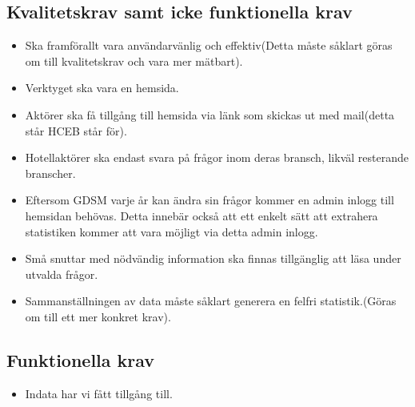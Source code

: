 \documentclass{article}
\begin{document}
    \subsection{Kvalitetskrav samt icke funktionella krav}
        \begin{itemize}
            \item Ska framförallt vara användarvänlig och effektiv(Detta måste såklart göras om till kvalitetskrav och vara mer mätbart).
            \\
            \item Verktyget ska vara en hemsida.
            \\
            \item Aktörer ska få tillgång till hemsida via länk som skickas ut med mail(detta står HCEB står för).
            \\
            \item Hotellaktörer ska endast svara på frågor inom deras bransch, likväl resterande branscher. 
            \\
            \item Eftersom GDSM varje år kan ändra sin frågor kommer en admin inlogg till hemsidan behövas. Detta innebär också att ett enkelt sätt att extrahera statistiken kommer att vara möjligt via detta admin inlogg. 
            \\
            \item Små snuttar med nödvändig information ska finnas tillgänglig att läsa under utvalda frågor.
            \\
             \item Sammanställningen av data måste såklart generera en felfri statistik.(Göras om till ett mer konkret krav).
        \end{itemize}
        
       \subsection{Funktionella krav}
            \begin{itemize}
             \item Indata har vi fått tillgång till.
             \end{itemize}
    
\end{document}
